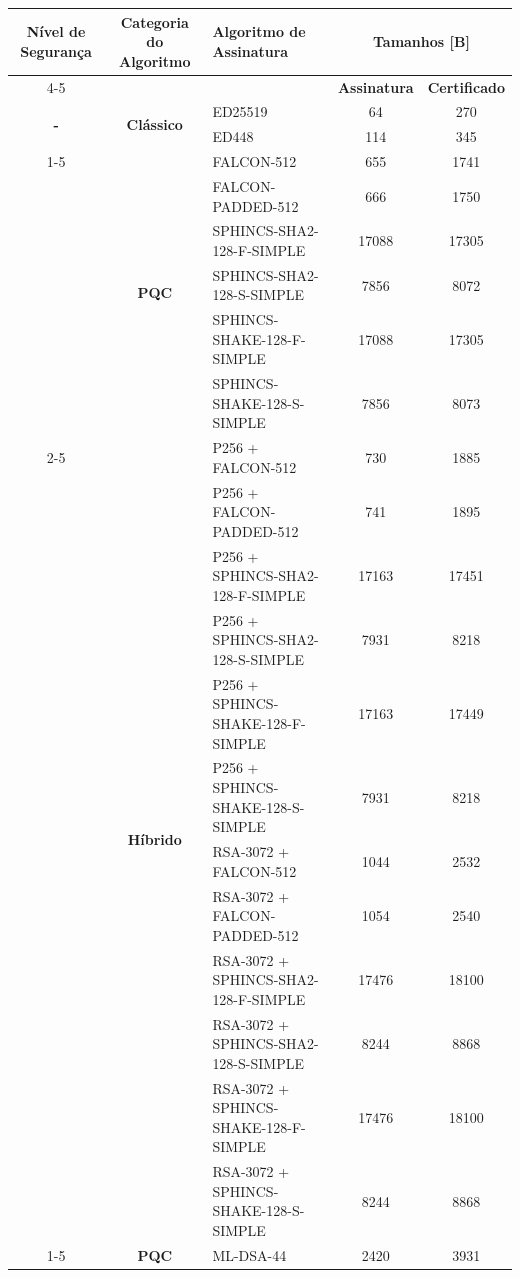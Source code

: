 \documentclass[10pt]{article}
\begin{document}
\centering
\small
\begin{tabular}{@{}c c l c c@{}}
\toprule
\multirow[c]{2}{*}{\textbf{Nível de Segurança}} & \multirow[c]{2}{*}{\textbf{Categoria do Algoritmo}} & \multirow[c]{2}{*}{\textbf{Algoritmo de Assinatura}} & \multicolumn{2}{c}{\textbf{Tamanhos [B]}} \\
\cmidrule(lr){4-5}
\addlinespace[0.45ex]
 &  &  & \textbf{Assinatura} & \textbf{Certificado} \\
\midrule
\multirow[c]{2}{*}{\textbf{-}} & \multirow[c]{2}{*}{\textbf{Clássico}} & ED25519 & 64 & 270 \\
 &  & ED448 & 114 & 345 \\
\cmidrule(lr){1-5}
\multirow[c]{18}{*}{\textbf{I}} & \multirow[c]{6}{*}{\textbf{PQC}} & FALCON-512 & 655 & 1741 \\
 &  & FALCON-PADDED-512 & 666 & 1750 \\
 &  & SPHINCS-SHA2-128-F-SIMPLE & 17088 & 17305 \\
 &  & SPHINCS-SHA2-128-S-SIMPLE & 7856 & 8072 \\
 &  & SPHINCS-SHAKE-128-F-SIMPLE & 17088 & 17305 \\
 &  & SPHINCS-SHAKE-128-S-SIMPLE & 7856 & 8073 \\
\cmidrule(lr){2-5}
 & \multirow[c]{12}{*}{\textbf{Híbrido}} & P256 + FALCON-512 & 730 & 1885 \\
 &  & P256 + FALCON-PADDED-512 & 741 & 1895 \\
 &  & P256 + SPHINCS-SHA2-128-F-SIMPLE & 17163 & 17451 \\
 &  & P256 + SPHINCS-SHA2-128-S-SIMPLE & 7931 & 8218 \\
 &  & P256 + SPHINCS-SHAKE-128-F-SIMPLE & 17163 & 17449 \\
 &  & P256 + SPHINCS-SHAKE-128-S-SIMPLE & 7931 & 8218 \\
 &  & RSA-3072 + FALCON-512 & 1044 & 2532 \\
 &  & RSA-3072 + FALCON-PADDED-512 & 1054 & 2540 \\
 &  & RSA-3072 + SPHINCS-SHA2-128-F-SIMPLE & 17476 & 18100 \\
 &  & RSA-3072 + SPHINCS-SHA2-128-S-SIMPLE & 8244 & 8868 \\
 &  & RSA-3072 + SPHINCS-SHAKE-128-F-SIMPLE & 17476 & 18100 \\
 &  & RSA-3072 + SPHINCS-SHAKE-128-S-SIMPLE & 8244 & 8868 \\
\cmidrule(lr){1-5}
\multirow[c]{3}{*}{\textbf{II}} & \multirow[c]{1}{*}{\textbf{PQC}} & ML-DSA-44 & 2420 & 3931 \\

\end{tabular}
\end{document}
